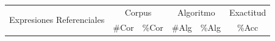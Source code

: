 \begin{table}
\begin{small}
\begin{center}
\begin{tabular}{|l|r|r|r|r|r|}
\hline
\multirow{2}{*}{Expresiones Referenciales} & \multicolumn{2}{|c|}{Corpus} & \multicolumn{2}{|c|}{Algoritmo} & Exactitud \\ \cline{2-6} 
 & \#Cor & \multicolumn{1}{|c|}{\%Cor} & \multicolumn{1}{|c|}{\#Alg} & \multicolumn{1}{|c|}{\%Alg} & \multicolumn{1}{|c|}{\%Acc} \\
\hline

\end{tabular}
\end{center}
\end{small}
\end{table}
